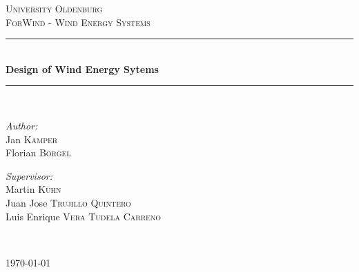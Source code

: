 \begin{titlepage}
\begin{center}


\textsc{\LARGE University Oldenburg}\\[1.5cm]

\textsc{\Large ForWind - Wind Energy Systems}\\[0.5cm]


\newcommand{\HRule}{\rule{\linewidth}{0.5mm}}
\HRule \\[0.4cm]
{ \huge \bfseries Design of Wind Energy Sytems}\\[0.4cm]

\HRule \\[1.5cm]

\begin{minipage}{0.4\textwidth}
\begin{flushleft} \large
\emph{Author:}\\
Jan \textsc{K\"amper}\\
Florian \textsc{B\"orgel}
\end{flushleft}
\end{minipage}
\hfill
\begin{minipage}{0.4\textwidth}
\begin{flushright} \large
\emph{Supervisor:} \\
Martin \textsc{Kühn}\\
Juan Jose \textsc{Trujillo Quintero}\\
Luis Enrique \textsc{Vera Tudela Carreno}
\end{flushright}
\end{minipage}
\\[3cm]
\vfill



{\large \today}

\end{center}

\end{titlepage}
